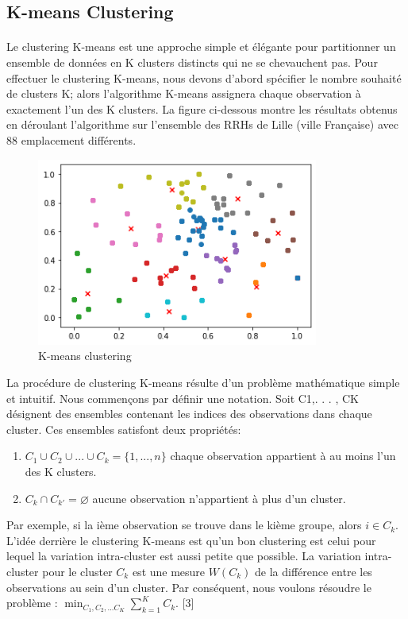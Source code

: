 \documentclass{report}
\begin{document}
\subsection{K-means Clustering} 
\paragraph{}
Le clustering K-means est une approche simple et élégante pour partitionner un ensemble de données en K clusters distincts qui ne se chevauchent pas. Pour effectuer le clustering K-means, nous devons d'abord spécifier le nombre souhaité de clusters K; alors l'algorithme K-means assignera chaque observation à exactement l'un des K clusters. 
La figure ci-dessous montre les résultats obtenus en déroulant l'algorithme sur l'ensemble des RRHs de Lille (ville Française) avec 88 emplacement différents.

\begin{figure}[h]
  \centering
  \includegraphics[width=25em]{images/k-means_lille.png}
  \caption{K-means clustering}
\end{figure}

La procédure de clustering K-means résulte d'un problème mathématique simple et intuitif. Nous commençons par définir une notation. Soit C1,. . . , CK désignent des ensembles contenant les indices des observations dans chaque cluster. Ces ensembles satisfont deux propriétés:
\begin{enumerate}
\item $C_{1} \cup C_{2} \cup ... \cup C_{k}=\lbrace1,...,n\rbrace$ chaque observation appartient à au moins l'un des K clusters.
\item $C_{k} \cap C_{k'}= \varnothing $ aucune observation n'appartient à plus d'un cluster.
\end{enumerate}
Par exemple, si la ième observation se trouve dans le kième groupe, alors $i \in C_{k}$. L'idée derrière le clustering K-means est qu'un bon clustering est celui pour lequel la variation intra-cluster est aussi petite que possible. La variation intra-cluster pour le cluster $C_{k}$ est une mesure $W(C_{k})$ de la différence entre les observations au sein d'un cluster. Par conséquent, nous voulons résoudre le problème :
$\min_{C_{1}, C_{2}, ... C_{K}}\sum^K_{k=1}C_{k}$. [3]
\end{document}
